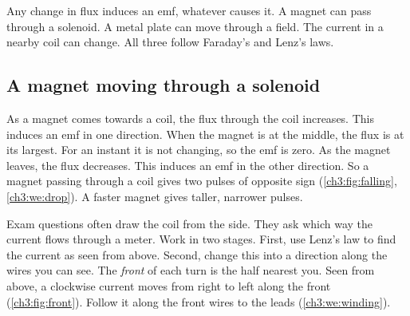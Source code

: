\begin{bigidea}
Any change in flux induces an emf, whatever causes it. A magnet can pass through
a solenoid. A metal plate can move through a field. The current in a nearby coil
can change. All three follow Faraday's and Lenz's laws.
\end{bigidea}

\begin{keywords}
\end{keywords}

\subsection{A magnet moving through a solenoid}

As a magnet comes towards a coil, the flux through the coil increases. This
induces an emf in one direction. When the magnet is at the middle, the flux is at
its largest. For an instant it is not changing, so the emf is zero. As the magnet
leaves, the flux decreases. This induces an emf in the other direction. So a
magnet passing through a coil gives two pulses of opposite sign
(\cref{ch3:fig:falling}, \cref{ch3:we:drop}). A faster magnet gives taller,
narrower pulses.

Exam questions often draw the coil from the side. They ask which way the current
flows through a meter. Work in two stages. First, use Lenz's law to find the
current as seen from above. Second, change this into a direction along the wires
you can see. The \emph{front} of each turn is the half nearest you. Seen from
above, a clockwise current moves from right to left along the front
(\cref{ch3:fig:front}). Follow it along the front wires to the leads
(\cref{ch3:we:winding}).

